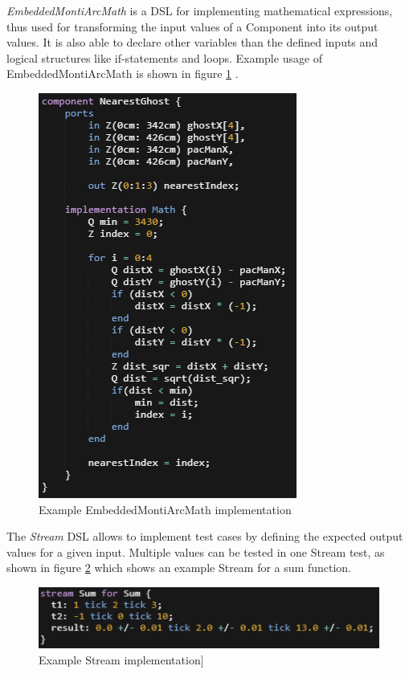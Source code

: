 \emph{EmbeddedMontiArcMath} is a DSL for implementing mathematical expressions, thus used for transforming the input values of a Component into its output values. It is also able to declare other variables than the defined inputs and logical structures like if-statements and loops. Example usage of EmbeddedMontiArcMath is shown in figure \ref{fig:EMontiArcMath} .

\begin{figure}[!h]
	\centering
	\includegraphics[scale=0.55]{pictures/EMAMath.PNG}
	\caption{Example EmbeddedMontiArcMath implementation}
	\label{fig:EMontiArcMath}
\end{figure}

The \emph{Stream} DSL allows to implement test cases by defining the expected output values for a given input. Multiple values can be tested in one Stream test, as shown in figure \ref{fig:EMAStream} which shows an example Stream for a sum function.

\begin{figure}[!h]
	\centering
	\includegraphics[scale=0.55]{pictures/EMAStream.PNG}
	\caption{Example Stream implementation]}
	\label{fig:EMAStream}
\end{figure}



